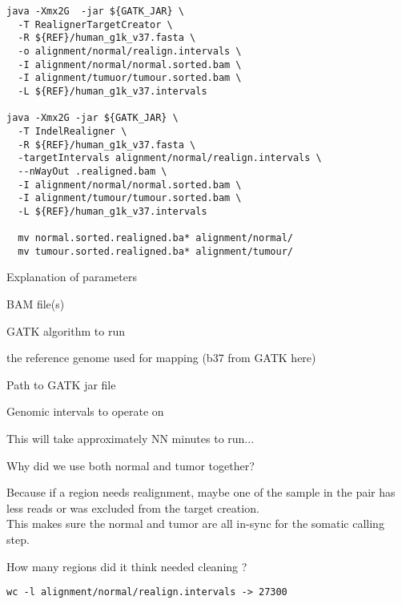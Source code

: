 \begin{lstlisting}
java -Xmx2G  -jar ${GATK_JAR} \
  -T RealignerTargetCreator \
  -R ${REF}/human_g1k_v37.fasta \
  -o alignment/normal/realign.intervals \
  -I alignment/normal/normal.sorted.bam \
  -I alignment/tumuor/tumour.sorted.bam \
  -L ${REF}/human_g1k_v37.intervals

java -Xmx2G -jar ${GATK_JAR} \
  -T IndelRealigner \
  -R ${REF}/human_g1k_v37.fasta \
  -targetIntervals alignment/normal/realign.intervals \
  --nWayOut .realigned.bam \
  -I alignment/normal/normal.sorted.bam \
  -I alignment/tumour/tumour.sorted.bam \
  -L ${REF}/human_g1k_v37.intervals

  mv normal.sorted.realigned.ba* alignment/normal/
  mv tumour.sorted.realigned.ba* alignment/tumour/
\end{lstlisting}


\begin{note}
Explanation of parameters
\begin{description}[style=multiline,labelindent=0cm,align=right,leftmargin=\descriptionlabelspace,rightmargin=1.5cm,font=\ttfamily]
 \item[-I] BAM file(s)
 \item[-T] GATK algorithm to run
 \item[-R] the reference genome used for mapping (b37 from GATK here)
 \item[-jar] Path to GATK jar file
 \item[-L] Genomic intervals to operate on
\end{description}
\end{note}

This will take approximately NN minutes to run... \\

\begin{questions} 
Why did we use both normal and tumor together?
\end{questions}
\begin{answer}
Because if a region needs realignment, maybe one of the sample in the pair has less reads or was excluded from the target creation. \\
This makes sure the normal and tumor are all in-sync for the somatic calling step. 
\end{answer}

\begin{questions} 
How many regions did it think needed cleaning ? 
\end{questions}
\begin{answer}
\begin{lstlisting}
wc -l alignment/normal/realign.intervals -> 27300
\end{lstlisting}
\end{answer}

